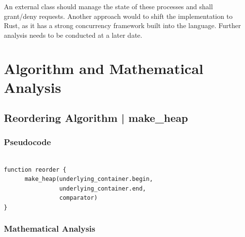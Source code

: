 \documentclass{article}
\begin{document}
An external class should manage the state of these processes and shall grant/deny requests.
Another approach would to shift the implementation to Rust, as it has a strong concurrency framework built into the language.
Further analysis needs to be conducted at a later date.

\newpage

\section{Algorithm and Mathematical Analysis}

\subsection{Reordering Algorithm | make_heap}

\subsubsection{Pseudocode}

\begin{verbatim}

function reorder {
      make_heap(underlying_container.begin, 
                underlying_container.end,
                comparator)
}
\end{verbatim}

\subsubsection{Mathematical Analysis}
\end{document}
